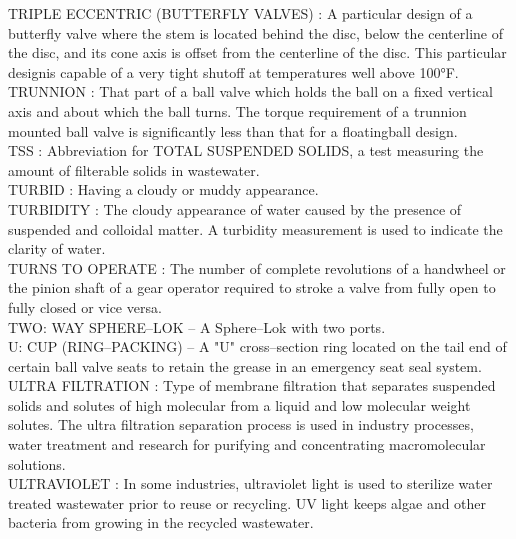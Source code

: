 \vspace{0.15cm}
TRIPLE ECCENTRIC (BUTTERFLY VALVES) :   A particular design of a butterfly valve where the stem is located behind the disc, below the centerline of the disc, and its cone axis is offset from the centerline of the disc. This particular designis capable of a very tight shutoff at temperatures well above 100°F.\\
\vspace{0.15cm}
TRUNNION :   That part of a ball valve which holds the ball on a fixed vertical axis and about which the ball turns. The torque requirement of a trunnion mounted ball valve is significantly less than that for a floatingball design.\\
\vspace{0.15cm}
TSS :  Abbreviation for TOTAL SUSPENDED SOLIDS, a test measuring the amount of filterable solids in wastewater.\\
\vspace{0.15cm}
TURBID :  Having a cloudy or muddy appearance.\\
\vspace{0.15cm}
TURBIDITY :  The cloudy appearance of water caused by the presence of suspended and colloidal matter. A turbidity measurement is used to indicate the clarity of water.\\
\vspace{0.15cm}
TURNS TO OPERATE :   The number of complete revolutions of a handwheel or the pinion shaft of a gear operator required to stroke a valve from fully open to fully closed or vice versa.\\
\vspace{0.15cm}
TWO: WAY SPHERE–LOK –  A Sphere–Lok with two ports.\\
\vspace{0.15cm}
U: CUP (RING–PACKING) –  A "U" cross–section ring located on the tail end of certain ball valve seats to retain the grease in an emergency seat seal system.\\
\vspace{0.15cm}
ULTRA FILTRATION :   Type of membrane filtration that separates suspended solids and solutes of high molecular from a liquid and low molecular weight solutes. The ultra filtration separation process is used in industry processes, water treatment and research for purifying and concentrating macromolecular solutions.\\
\vspace{0.15cm}
ULTRAVIOLET :   In some industries, ultraviolet light is used to sterilize water treated wastewater prior to reuse or recycling. UV light keeps algae and other bacteria from growing in the recycled wastewater.\\
